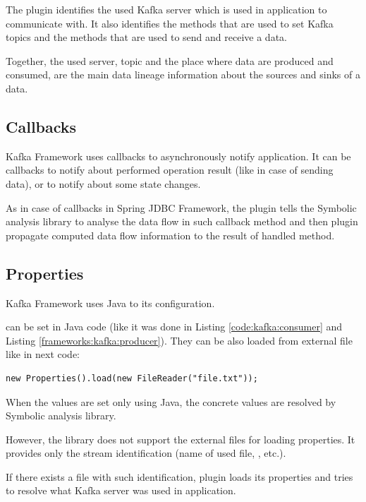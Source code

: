 The plugin identifies the used Kafka server which is used in application to communicate with.
It also identifies the methods that are used to set Kafka topics
and the methods that are used to send and receive a data.

Together, the used server, topic and the place where data are produced and consumed,
are the main data lineage information about the sources and sinks of a data.




\subsection{Callbacks}

Kafka Framework uses callbacks to asynchronously notify application.
It can be callbacks to notify about performed operation result (like in case of sending data),
or to notify about some state changes.

As in case of callbacks in Spring JDBC Framework, the plugin tells
the Symbolic analysis library to analyse the data flow in such callback method
and then plugin propagate computed data flow information 
to the result of handled method.




\subsection{Properties}

Kafka Framework uses Java  to its configuration.

 can be set in Java code (like it was done in
Listing \ref{code:kafka:consumer} and Listing \ref{frameworks:kafka:producer}).
They can be also loaded from external file like in next code:
\begin{lstlisting}[language=JavaSnippet]
        new Properties().load(new FileReader("file.txt"));
\end{lstlisting}

When the  values are set only using Java, the concrete
values are resolved by Symbolic analysis library.

However, the library does not support the external files for loading properties.
It provides only the stream identification (name of used file, , etc.).

If there exists a file with such identification, plugin loads its properties and
tries to resolve what Kafka server was used in application.


